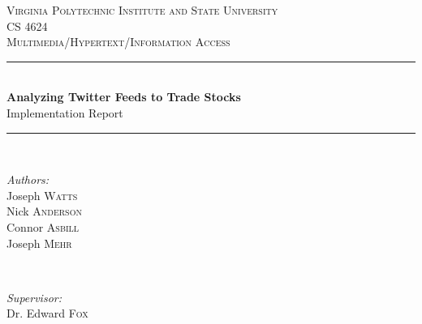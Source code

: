 
\begin{titlepage}

\newcommand{\HRule}{\rule{\linewidth}{0.5mm}} %

\center %
 

\LARGE\textsc{Virginia Polytechnic Institute and State University}\\[0.5cm] %
\textsc{\Large CS 4624}\\ %
\textsc{\large Multimedia/Hypertext/Information Access}\\[0.5cm] %


\HRule \\[0.4cm]
{ \huge \bfseries Analyzing Twitter Feeds to Trade Stocks}\\[0.2cm] %
{ \large \sc Implementation Report}
\HRule \\[1.5cm]
 

\begin{minipage}{0.4\textwidth}
\begin{flushleft} \large
\emph{Authors:}\\
Joseph \textsc{Watts} \\
Nick \textsc{Anderson} \\
Connor \textsc{Asbill} \\
Joseph \textsc{Mehr}

\end{flushleft}
\end{minipage}
~
\begin{minipage}{0.4\textwidth}
\begin{flushright} \large
\emph{Supervisor:} \\
Dr. Edward \textsc{Fox} \\[0.3em]


\end{flushright}
\end{minipage}
\end{titlepage}
